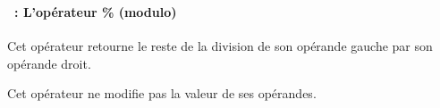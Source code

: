 \begin{frame}[containsverbatim]
  \frametitle{\secname}
  \framesubtitle{\subsecname~: L'opérateur \% (modulo)} 

  Cet opérateur retourne le reste de la division de son opérande gauche par son opérande droit.
  \vspace{0.5cm}
  \par
  Cet opérateur ne modifie pas la valeur de 
  ses opérandes.
  \vspace{0.5cm}
\end{frame}

